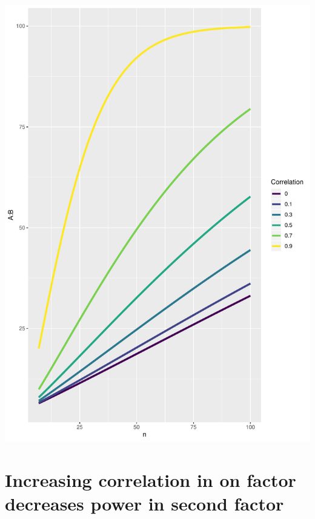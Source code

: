 \documentclass[]{book}
\begin{document}
\includegraphics{SuperpowerValidation_files/figure-latex/unnamed-chunk-219-1.pdf}

\hypertarget{increasing-correlation-in-on-factor-decreases-power-in-second-factor}{%
\section{Increasing correlation in on factor decreases power in second factor}\label{increasing-correlation-in-on-factor-decreases-power-in-second-factor}}
\end{document}
